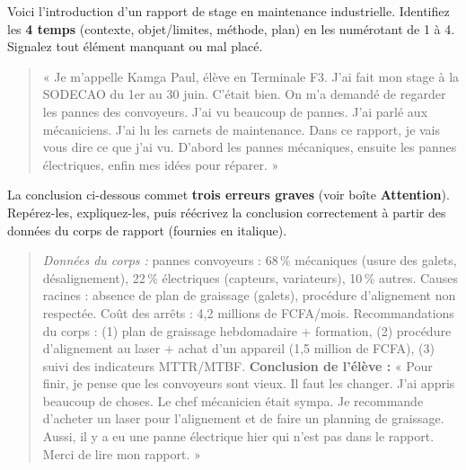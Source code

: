 \documentclass[11pt]{article}
\newcounter{popsec}
\newcounter{popsub}
\newcommand{\courssub}[1]{%
  \stepcounter{popsub}%
  \par\vspace{9pt}\noindent{\popxbold\fontsize{11.5}{13}\selectfont\color{popink}{\color{poporange}\thepopsec.\thepopsub}\hspace{6pt}#1}\par\nopagebreak\vspace{4pt}
}
\begin{document}
\courssub{Exercices d'application}

\begin{exercice}
Voici l'introduction d'un rapport de stage en maintenance industrielle. Identifiez les \textbf{4 temps} (contexte, objet/limites, méthode, plan) en les numérotant de 1 à 4. Signalez tout élément manquant ou mal placé.
\begin{quote}
« Je m'appelle Kamga Paul, élève en Terminale F3. J'ai fait mon stage à la SODECAO du 1er au 30 juin. C'était bien. On m'a demandé de regarder les pannes des convoyeurs. J'ai vu beaucoup de pannes. J'ai parlé aux mécaniciens. J'ai lu les carnets de maintenance. Dans ce rapport, je vais vous dire ce que j'ai vu. D'abord les pannes mécaniques, ensuite les pannes électriques, enfin mes idées pour réparer. »
\end{quote}
\end{exercice}

\begin{exercice}
La conclusion ci-dessous commet \textbf{trois erreurs graves} (voir boîte \textbf{Attention}). Repérez-les, expliquez-les, puis réécrivez la conclusion correctement à partir des données du corps de rapport (fournies en italique).
\begin{quote}
\textit{Données du corps :} pannes convoyeurs : 68\,\% mécaniques (usure des galets, désalignement), 22\,\% électriques (capteurs, variateurs), 10\,\% autres. Causes racines : absence de plan de graissage (galets), procédure d'alignement non respectée. Coût des arrêts : 4,2 millions de FCFA/mois. Recommandations du corps : (1) plan de graissage hebdomadaire + formation, (2) procédure d'alignement au laser + achat d'un appareil (1,5 million de FCFA), (3) suivi des indicateurs MTTR/MTBF.
\textbf{Conclusion de l'élève :} « Pour finir, je pense que les convoyeurs sont vieux. Il faut les changer. J'ai appris beaucoup de choses. Le chef mécanicien était sympa. Je recommande d'acheter un laser pour l'alignement et de faire un planning de graissage. Aussi, il y a eu une panne électrique hier qui n'est pas dans le rapport. Merci de lire mon rapport. »
\end{quote}
\end{exercice}
\end{document}
